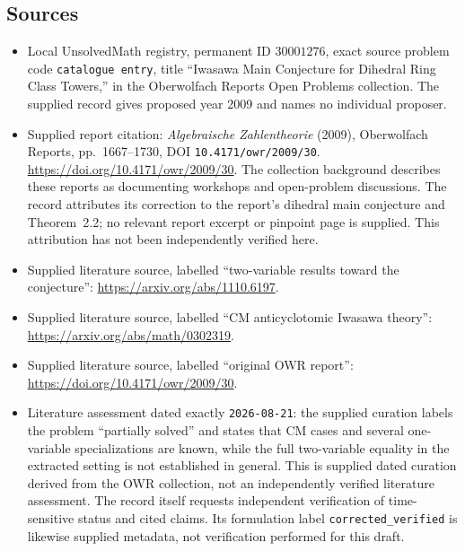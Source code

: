 \documentclass[11pt]{article}
\begin{document}
\subsection{Sources}
\begin{itemize}
\item Local UnsolvedMath registry, permanent ID \(30001276\), exact source problem code \texttt{catalogue entry}, title ``Iwasawa Main Conjecture for Dihedral Ring Class Towers,'' in the Oberwolfach Reports Open Problems collection. The supplied record gives proposed year 2009 and names no individual proposer.
\item Supplied report citation: \emph{Algebraische Zahlentheorie} (2009), Oberwolfach Reports, pp.~1667--1730, DOI \texttt{10.4171/owr/2009/30}. \url{https://doi.org/10.4171/owr/2009/30}. The collection background describes these reports as documenting workshops and open-problem discussions. The record attributes its correction to the report's dihedral main conjecture and Theorem~2.2; no relevant report excerpt or pinpoint page is supplied. This attribution has not been independently verified here.
\item Supplied literature source, labelled ``two-variable results toward the conjecture'': \url{https://arxiv.org/abs/1110.6197}.
\item Supplied literature source, labelled ``CM anticyclotomic Iwasawa theory'': \url{https://arxiv.org/abs/math/0302319}.
\item Supplied literature source, labelled ``original OWR report'': \url{https://doi.org/10.4171/owr/2009/30}.
\item Literature assessment dated exactly \texttt{2026-08-21}: the supplied curation labels the problem ``partially solved'' and states that CM cases and several one-variable specializations are known, while the full two-variable equality in the extracted setting is not established in general. This is supplied dated curation derived from the OWR collection, not an independently verified literature assessment. The record itself requests independent verification of time-sensitive status and cited claims. Its formulation label \texttt{corrected\_verified} is likewise supplied metadata, not verification performed for this draft.
\end{itemize}
\end{document}
